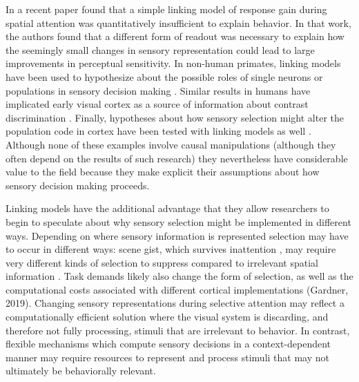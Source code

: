 In a recent paper \citet{Pestilli2011-gi} found that a simple linking model of response gain during spatial attention was quantitatively insufficient to explain behavior. In that work, the authors found that a different form of readout was necessary to explain how the seemingly small changes in sensory representation could lead to large improvements in perceptual sensitivity. In non-human primates, linking models have been used to hypothesize about the possible roles of single neurons or populations in sensory decision making \citep{Newsome1989-fr}. Similar results in humans have implicated early visual cortex as a source of information about contrast discrimination \citep{Boynton1999-jd}. Finally, hypotheses about how sensory selection might alter the population code in cortex have been tested with linking models as well \citep{Cohen2011-pa}. Although none of these examples involve causal manipulations (although they often depend on the results of such research) they nevertheless have considerable value to the field because they make explicit their assumptions about how sensory decision making proceeds.

Linking models have the additional advantage that they allow researchers to begin to speculate about why sensory selection might be implemented in different ways. Depending on where sensory information is represented selection may have to occur in different ways: scene gist, which survives inattention \citep{Li2002-ji,Peelen2009-us}, may require very different kinds of selection to suppress compared to irrelevant spatial information \citep{Pestilli2011-gi}. Task demands likely also change the form of selection, as well as the computational costs associated with different cortical implementations (Gardner, 2019). Changing sensory representations during selective attention may reflect a computationally efficient solution where the visual system is discarding, and therefore not fully processing, stimuli that are irrelevant to behavior. In contrast, flexible mechanisms which compute sensory decisions in a context-dependent manner \citep{Mante2013-tn} may require resources to represent and process stimuli that may not ultimately be behaviorally relevant. 